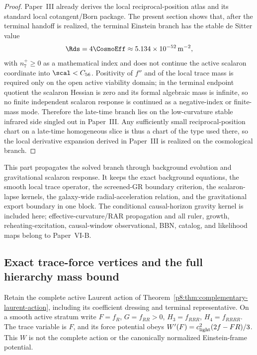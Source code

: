 \documentclass[12pt,a4paper]{article}
\begin{document}
\begin{proof}
Paper~III already derives the local reciprocal-position atlas and its standard local cotangent/Born
package. The present section shows that, after the terminal handoff is realized, the
terminal Einstein branch has the stable de Sitter value
\[
\Rds = 4 \CosmoEff \approx 5.134 \times 10^{-52}\, \rm m^{-2},
\]
with \(n_7^+\ge0\) as a mathematical index and does not continue the active
scalaron coordinate into \(\scal<C_{56}\).  Positivity of \(f''\) and of the
local trace mass is required only on the open active viability domain; in the
terminal endpoint quotient the scalaron Hessian is zero and its formal
algebraic mass is infinite, so no finite independent scalaron response is
continued as a negative-index or finite-mass mode.
Therefore the late-time branch lies on the low-curvature stable infrared side singled out in
Paper~III. Any sufficiently small reciprocal-position chart on a late-time homogeneous slice is
thus a chart of the type used there, so the local derivative expansion derived in Paper~III is
realized on the cosmological branch.
\end{proof}


\label{p8:part:background-scalaron-response}

This part propagates the solved branch through background evolution and gravitational scalaron response.  It keeps the exact background equations, the smooth local trace operator, the screened-GR boundary criterion, the scalaron-lapse kernels, the galaxy-wide radial-acceleration relation, and the gravitational export boundary in one block.  The conditional causal-horizon gravity kernel is included here; effective-curvature/RAR propagation and all ruler, growth, reheating-excitation, causal-window observational, BBN, catalog, and likelihood maps belong to Paper~VI-B.

\subsection{Exact trace-force vertices and the full hierarchy mass bound}
\label{p8:sec:v199-source-vertices}
Retain the complete active Laurent action of
Theorem~\ref{p8:thm:complementary-laurent-action}, including its coefficient
dressing and terminal representative.  On a smooth active stratum write
\(F=f_R\), \(G=f_{RR}>0\), \(H_3=f_{RRR}\), \(H_4=f_{RRRR}\).
The trace variable is \(F\), and its force potential obeys
\(W'(F)=c_{\rm light}^2(2f-FR)/3\).  This \(W\) is not the complete
action or the canonically normalized Einstein-frame potential.
\end{document}
